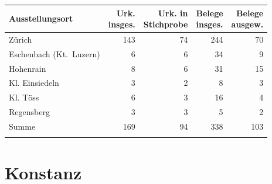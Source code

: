 \begin{tabularx}{\linewidth}{X r r r r}
\lsptoprule
Ausstellungsort
	& \makecell{Urk.\\ insges.}
	& \makecell{Urk. in\\ Stichprobe}
	& \makecell{Belege\\ insges.}
	& \makecell{Belege\\ ausgew.}
	\\
\midrule

Zürich
	& 143
	& 74
	& 244
	& 70
	\\

Eschenbach (Kt.~Luzern)
	& 6
	& 6
	& 34
	& 9
	\\

Hohenrain
	& 8
	& 6
	& 31
	& 15
	\\

Kl. Einsiedeln
	& 3
	& 2
	& 8
	& 3
	\\

Kl. Töss
	& 6
	& 3
	& 16
	& 4
	\\

Regensberg
	& 3
	& 3
	& 5
	& 2
	\\

\midrule

Summe
	& 169
	& 94
	& 338
	& 103
	\\

\lspbottomrule
\end{tabularx}


\section{Konstanz}

